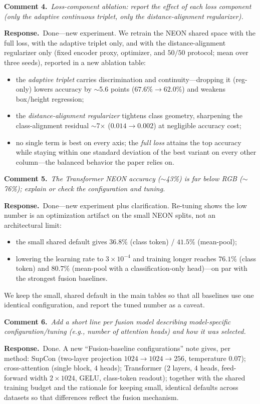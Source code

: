 \documentclass[10pt,twocolumn,letterpaper]{article}
\newcommand{\cmt}[2]{\smallskip\noindent\textbf{Comment #1.}\ \textit{#2}\par}
\newcommand{\resp}[1]{\noindent\textbf{Response.}\ #1\par}
\begin{document}
{\cmt{4}{Loss-component ablation: report the effect of each loss component (only
the adaptive continuous triplet, only the distance-alignment regularizer).}
\resp{Done---new experiment. We retrain the NEON shared space with the full loss,
with the adaptive triplet only, and with the distance-alignment regularizer only
(fixed encoder proxy, optimizer, and $50/50$ protocol; mean over three seeds),
reported in a new ablation table:}
\begin{itemize}
  \item the \emph{adaptive triplet} carries discrimination and continuity---dropping it (reg-only) lowers accuracy by $\sim$5.6 points ($67.6\%\rightarrow62.0\%$) and weakens box/height regression;
  \item the \emph{distance-alignment regularizer} tightens class geometry, sharpening the class-alignment residual $\sim$7$\times$ ($0.014\rightarrow0.002$) at negligible accuracy cost;
  \item no single term is best on every axis; the \emph{full loss} attains the top accuracy while staying within one standard deviation of the best variant on every other column---the balanced behavior the paper relies on.
\end{itemize}

\cmt{5}{The Transformer NEON accuracy ($\sim$43\%) is far below RGB ($\sim$76\%);
explain or check the configuration and tuning.}
\resp{Done---new experiment plus clarification. Re-tuning shows the low number is
an optimization artifact on the small NEON splits, not an architectural limit:}
\begin{itemize}
  \item the small shared default gives $36.8\%$ (class token) / $41.5\%$ (mean-pool);
  \item lowering the learning rate to $3\times10^{-4}$ and training longer reaches $76.1\%$ (class token) and $80.7\%$ (mean-pool with a classification-only head)---on par with the strongest fusion baselines.
\end{itemize}
\noindent We keep the small, shared default in the main tables so that all
baselines use one identical configuration, and report the tuned number as a
caveat.

\cmt{6}{Add a short line per fusion model describing model-specific
configuration/tuning (e.g., number of attention heads) and how it was selected.}
\resp{Done. A new ``Fusion-baseline configurations'' note gives, per method:
SupCon (two-layer projection $1024{\to}1024{\to}256$, temperature $0.07$);
cross-attention (single block, $4$ heads); Transformer ($2$ layers, $4$ heads,
feed-forward width $2{\times}1024$, GELU, class-token readout); together with the
shared training budget and the rationale for keeping small, identical defaults
across datasets so that differences reflect the fusion mechanism.}

}
\end{document}
